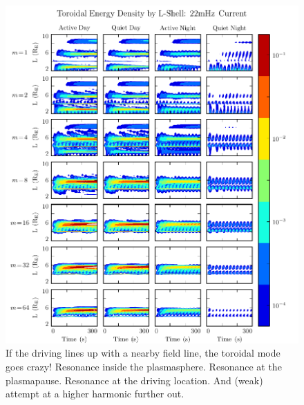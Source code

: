 \begin{figure}[H]
    \centering
    \includegraphics[width=\textwidth]{figures/ucolor_tor_022mHz.pdf}
    \caption[Toroidal Energy Density by L-Shell: 22mHz]{
      If the driving lines up with a nearby field line, the toroidal mode goes crazy! Resonance inside the plasmasphere. Resonance at the plasmapause. Resonance at the driving location. And (weak) attempt at a higher harmonic further out. 
    }
    \label{fig_ucolor_tor_022mHz}
\end{figure}

